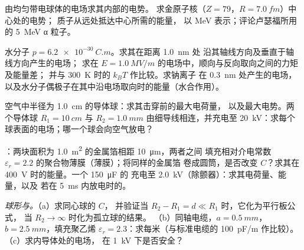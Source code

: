 \begin{exercise}[$\star\star$]\label{exo:b1:potential-capacitors:6}
由均匀带电球体的电场求其内部的电势。
求金原子核（$Z = 79$，$R = \qty{7.0}{fm}$）中心处的电势；
质子从远处抵达中心所需的能量，
以 \unit{MeV} 表示；评论卢瑟福所用的 \qty{5}{MeV} α 粒子。
\end{exercise}

\begin{exercise}[$\star\star$]\label{exo:b1:potential-capacitors:7}
水分子 $p = \qty{6.2e-30}{C.m}$。求其在距离 \qty{1.0}{nm} 处
沿其轴线方向及垂直于轴线方向产生的电场；
求在 $E = \qty{1.0}{MV/m}$ 的电场中，顺向与反向取向之间的力矩及能量差；
并与 \qty{300}{K} 时的 $k_BT$ 作比较。求钠离子
在 \qty{0.3}{nm} 处产生的电场，以及水分子偶极子在其中沿电场取向时的能量（水合作用）。
\end{exercise}

\begin{exercise}[$\star\star$]\label{exo:b1:potential-capacitors:8}
空气中半径为 \qty{1.0}{cm} 的导体球：求其击穿前的最大电荷量，
以及最大电势。两个导体球 $R_1 = \qty{10}{cm}$
与 $R_2 = \qty{1.0}{mm}$ 由细导线相连，并充电至
\qty{20}{kV}：求每个球表面的电场；哪一个球会向空气放电？
\end{exercise}

\begin{exercise}[$\star\star$]\label{exo:b1:potential-capacitors:9}
：两块面积为 \qty{1.0}{m^2} 的金属箔相距 \qty{10}{\micro m}，两者之间
填充相对介电常数 $\varepsilon_r = 2.2$ 的聚合物薄膜（薄膜）；将同样的金属箔
卷成圆筒，是否改变 $C$？求其在 \qty{400}{V} 时的能量。一个 \qty{150}{\micro F} 的
充电至 \qty{2.0}{kV}（除颤器）：求其电荷量、能量，以及
若在 \qty{5}{ms} 内放电时的。
\end{exercise}

\begin{exercise}[$\star\star\star$]\label{exo:b1:potential-capacitors:10}
\emph{球形与。}（a）求同心球的 $C$，
并验证当 $R_2 - R_1 = d \ll R_1$ 时，它化为平行板公式，
当 $R_2 \to \infty$ 时化为孤立球的结果。
（b）同轴电缆，$a = \qty{0.5}{mm}$，$b = \qty{2.5}{mm}$，填充聚乙烯
$\varepsilon_r = 2.3$：求每米（与标准电缆的 \qty{100}{pF/m}
作比较）。（c）求内导体处的电场，
在 \qty{1}{kV} 下是否安全？
\end{exercise}

